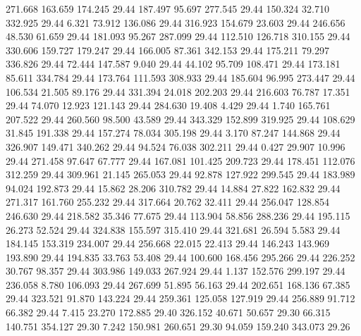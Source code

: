  271.668  163.659  174.245        29.44
 187.497   95.697  277.545        29.44
 150.324   32.710  332.925        29.44
   6.321   73.912  136.086        29.44
 316.923  154.679   23.603        29.44
 246.656   48.530   61.659        29.44
 181.093   95.267  287.099        29.44
 112.510  126.718  310.155        29.44
 330.606  159.727  179.247        29.44
 166.005   87.361  342.153        29.44
 175.211   79.297  336.826        29.44
  72.444  147.587    9.040        29.44
  44.102   95.709  108.471        29.44
 173.181   85.611  334.784        29.44
 173.764  111.593  308.933        29.44
 185.604   96.995  273.447        29.44
 106.534   21.505   89.176        29.44
 331.394   24.018  202.203        29.44
 216.603   76.787   17.351        29.44
  74.070   12.923  121.143        29.44
 284.630   19.408    4.429        29.44
   1.740  165.761  207.522        29.44
 260.560   98.500   43.589        29.44
 343.329  152.899  319.925        29.44
 108.629   31.845  191.338        29.44
 157.274   78.034  305.198        29.44
   3.170   87.247  144.868        29.44
 326.907  149.471  340.262        29.44
  94.524   76.038  302.211        29.44
   0.427   29.907   10.996        29.44
 271.458   97.647   67.777        29.44
 167.081  101.425  209.723        29.44
 178.451  112.076  312.259        29.44
 309.961   21.145  265.053        29.44
  92.878  127.922  299.545        29.44
 183.989   94.024  192.873        29.44
  15.862   28.206  310.782        29.44
  14.884   27.822  162.832        29.44
 271.317  161.760  255.232        29.44
 317.664   20.762   32.411        29.44
 256.047  128.854  246.630        29.44
 218.582   35.346   77.675        29.44
 113.904   58.856  288.236        29.44
 195.115   26.273   52.524        29.44
 324.838  155.597  315.410        29.44
 321.681   26.594    5.583        29.44
 184.145  153.319  234.007        29.44
 256.668   22.015   22.413        29.44
 146.243  143.969  193.890        29.44
 194.835   33.763   53.408        29.44
 100.600  168.456  295.266        29.44
 226.252   30.767   98.357        29.44
 303.986  149.033  267.924        29.44
   1.137  152.576  299.197        29.44
 236.058    8.780  106.093        29.44
 267.699   51.895   56.163        29.44
 202.651  168.136   67.385        29.44
 323.521   91.870  143.224        29.44
 259.361  125.058  127.919        29.44
 256.889   91.712   66.382        29.44
   7.415   23.270  172.885        29.40
 326.152   40.671   50.657        29.30
  66.315  140.751  354.127        29.30
   7.242  150.981  260.651        29.30
  94.059  159.240  343.073        29.26

